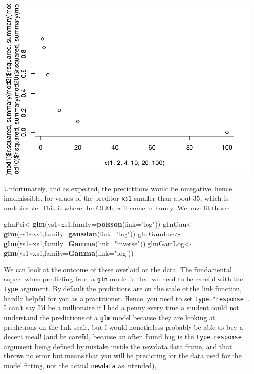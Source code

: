 \documentclass[
]{book}
\newenvironment{Shaded}{\begin{snugshade}}{\end{snugshade}}
\newcommand{\AttributeTok}[1]{\textcolor[rgb]{0.13,0.29,0.53}{#1}}
\newcommand{\FunctionTok}[1]{\textcolor[rgb]{0.13,0.29,0.53}{\textbf{#1}}}
\newcommand{\NormalTok}[1]{#1}
\newcommand{\OtherTok}[1]{\textcolor[rgb]{0.56,0.35,0.01}{#1}}
\newcommand{\SpecialCharTok}[1]{\textcolor[rgb]{0.81,0.36,0.00}{\textbf{#1}}}
\newcommand{\StringTok}[1]{\textcolor[rgb]{0.31,0.60,0.02}{#1}}
\begin{document}
\includegraphics{ECOMODbook_files/figure-latex/unnamed-chunk-29-1.pdf}

Unfortunately, and as expected, the predicttions would be nmegative, hence inadmissible, for values of the preditor \texttt{xs1} smaller than about 35, which is undesirable. This is where the GLMs will come in handy. We now fit those:

\begin{Shaded}
\begin{Highlighting}[]
\NormalTok{glmPoi}\OtherTok{\textless{}{-}}\FunctionTok{glm}\NormalTok{(ys1}\SpecialCharTok{\textasciitilde{}}\NormalTok{xs1,}\AttributeTok{family=}\FunctionTok{poisson}\NormalTok{(}\AttributeTok{link=}\StringTok{"log"}\NormalTok{))}
\NormalTok{glmGau}\OtherTok{\textless{}{-}}\FunctionTok{glm}\NormalTok{(ys1}\SpecialCharTok{\textasciitilde{}}\NormalTok{xs1,}\AttributeTok{family=}\FunctionTok{gaussian}\NormalTok{(}\AttributeTok{link=}\StringTok{"log"}\NormalTok{))}
\NormalTok{glmGamInv}\OtherTok{\textless{}{-}}\FunctionTok{glm}\NormalTok{(ys1}\SpecialCharTok{\textasciitilde{}}\NormalTok{xs1,}\AttributeTok{family=}\FunctionTok{Gamma}\NormalTok{(}\AttributeTok{link=}\StringTok{"inverse"}\NormalTok{))}
\NormalTok{glmGamLog}\OtherTok{\textless{}{-}}\FunctionTok{glm}\NormalTok{(ys1}\SpecialCharTok{\textasciitilde{}}\NormalTok{xs1,}\AttributeTok{family=}\FunctionTok{Gamma}\NormalTok{(}\AttributeTok{link=}\StringTok{"log"}\NormalTok{))}
\end{Highlighting}
\end{Shaded}

We can look at the outcome of these overlaid on the data. The fundamental aspect when predicting from a \texttt{glm} model is that we need to be careful with the \texttt{type} argument. By default the predictions are on the scale of the link function, hardly helpful for you as a practitioner. Hence, you need to set \texttt{type="response"}. I can't say I'd be a millionaire if I had a penny every time a student could not understand the predictions of a \texttt{glm} model because they are looking at predictions on the link scale, but I would nonetheless probably be able to buy a decent meal! (and be careful, because an often found bug is the \texttt{type=response} argument being defined by mistake inside the newdata data.frame, and that throws no error but means that you will be predicting for the data used for the model fitting, not the actual \texttt{newdata} as intended),
\end{document}
